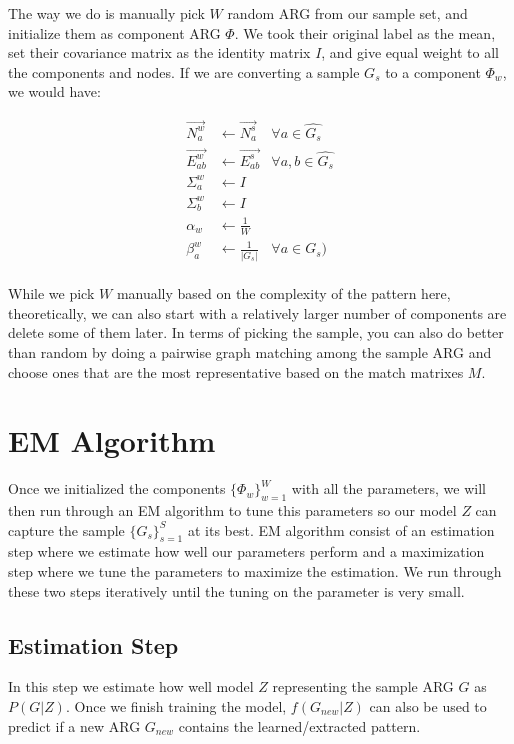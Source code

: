 The way we do is manually pick $W$ random ARG from our sample set, and initialize them as component ARG $\Phi$. We took their original label as the mean, set their covariance matrix as the identity matrix $I$, and give equal weight to all the components and nodes. If we are converting a sample $G_s$ to a component $\Phi_w$, we would have:

\begin{align} 
\overrightarrow{N^w_a} & \leftarrow \overrightarrow{N^s_a} & \forall a \in \widehat{G_s}\\
\overrightarrow{E^w_{ab}} & \leftarrow \overrightarrow{E^s_{ab}}& \forall a,b \in \widehat{G_s}\\
\Sigma^w_a & \leftarrow  I\\
\Sigma^w_b  & \leftarrow  I\\
\alpha_w & \leftarrow \frac{1}{W}\\
\beta^w_a & \leftarrow \frac{1}{|G_s|}& \forall a \in G_s)
\end{align}\\

While we pick $W$ manually based on the complexity of the pattern here, theoretically, we can also start with a relatively larger number of components are delete some of them later. In terms of picking the sample, you can also do better than random by doing a pairwise graph matching among the sample ARG and choose ones that are the most representative based on the match matrixes $M$.

\newpage

\section{EM Algorithm}

Once we initialized the components $\{\Phi_w\}_{w=1}^W$ with all the parameters, we will then run through an EM algorithm to tune this parameters so our model $Z$ can capture the sample $\{G_s\}_{s=1}^S$ at its best. EM algorithm consist of an estimation step where we estimate how well our parameters perform and a maximization step where we tune the parameters to maximize the estimation. We run through these two steps iteratively until the tuning on the parameter is very small.

\subsection{Estimation Step}

In this step we estimate how well model $Z$ representing the sample ARG $G$ as $P(G|Z)$. Once we finish training the model, $f(G_{new}|Z)$ can also be used to predict if a new ARG $G_{new}$ contains the learned/extracted pattern. \\

